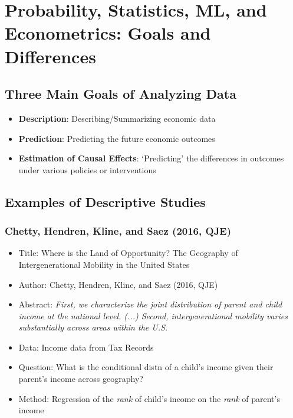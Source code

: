\section{Probability, Statistics, ML, and Econometrics: Goals and Differences}


\subsection{Three Main Goals of Analyzing Data}

\begin{itemize}
    \item \textbf{Description}: Describing/Summarizing economic data
    \item \textbf{Prediction}: Predicting the future economic outcomes
    \item \textbf{Estimation of Causal Effects}: `Predicting' the differences in outcomes under various policies or interventions
\end{itemize}

\subsection{Examples of Descriptive Studies}

\subsubsection{Chetty, Hendren, Kline, and Saez (2016, QJE)}

\begin{itemize}
    \item Title: Where is the Land of Opportunity? The Geography of Intergenerational Mobility in the United States
    \item Author: Chetty, Hendren, Kline, and Saez (2016, QJE)
    \item Abstract: \textit{First, we characterize the joint distribution of parent and child income at the national level. (...) Second, intergenerational mobility varies substantially across areas within the U.S.}
    \item Data: Income data from Tax Records
    \item Question: What is the conditional distn of a child's income given their parent's income across geography?
    \item Method: Regression of the \textit{rank} of child's income on the \textit{rank} of parent's income
\end{itemize}


